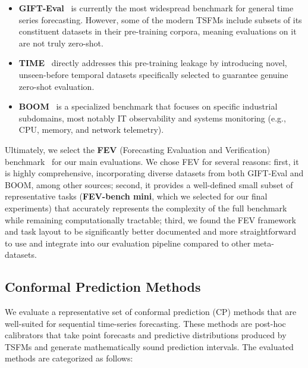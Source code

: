 \documentclass[12pt, a4paper]{article}
\begin{document}
\begin{itemize}
	\item \textbf{GIFT-Eval}~\cite{gift-eval} is currently the most widespread benchmark for general time series forecasting. However, some of the modern TSFMs include subsets of its constituent datasets in their pre-training corpora, meaning evaluations on it are not truly zero-shot.
	\item \textbf{TIME}~\cite{time} directly addresses this pre-training leakage by introducing novel, unseen-before temporal datasets specifically selected to guarantee genuine zero-shot evaluation.
	\item \textbf{BOOM}~\cite{toto} is a specialized benchmark that focuses on specific industrial subdomains, most notably IT observability and systems monitoring (e.g., CPU, memory, and network telemetry).
\end{itemize}

Ultimately, we select the \textbf{FEV} (Forecasting Evaluation and Verification) benchmark~\cite{fev-bench} for our main evaluations. We chose FEV for several reasons: first, it is highly comprehensive, incorporating diverse datasets from both GIFT-Eval and BOOM, among other sources; second, it provides a well-defined small subset of representative tasks (\textbf{FEV-bench mini}, which we selected for our final experiments) that accurately represents the complexity of the full benchmark while remaining computationally tractable; third, we found the FEV framework and task layout to be significantly better documented and more straightforward to use and integrate into our evaluation pipeline compared to other meta-datasets.

\subsection{Conformal Prediction Methods}
We evaluate a representative set of conformal prediction (CP) methods that are well-suited for sequential time-series forecasting. These methods are post-hoc calibrators that take point forecasts and predictive distributions produced by TSFMs and generate mathematically sound prediction intervals. The evaluated methods are categorized as follows:
\end{document}
